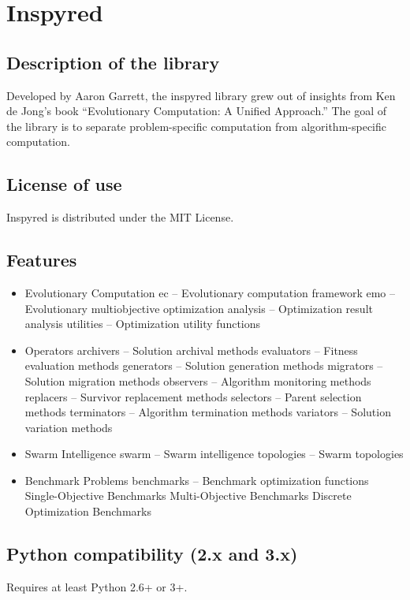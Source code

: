 \documentclass{article}
\begin{document}
\section{Inspyred}
\subsection{Description of the library}
 Developed by Aaron Garrett, the inspyred library grew out of insights from Ken de Jong’s book “Evolutionary Computation: A Unified Approach.” The goal of the library is to separate problem-specific computation from algorithm-specific computation.
\subsection{License of use}
 Inspyred is distributed under the MIT License. 
\subsection{Features}
\begin{itemize}
    \item Evolutionary Computation
        \subitem ec – Evolutionary computation framework
        \subitem emo – Evolutionary multiobjective optimization
        \subitem analysis – Optimization result analysis
        \subitem utilities – Optimization utility functions
    \item Operators
        \subitem archivers – Solution archival methods
        \subitem  evaluators – Fitness evaluation methods
        \subitem generators – Solution generation methods
        \subitem migrators – Solution migration methods
        \subitem observers – Algorithm monitoring methods
        \subitem replacers – Survivor replacement methods
        \subitem selectors – Parent selection methods
        \subitem terminators – Algorithm termination methods
        \subitem variators – Solution variation methods
    \item Swarm Intelligence
        \subitem swarm – Swarm intelligence
        \subitem topologies – Swarm topologies
    \item Benchmark Problems
        \subitem benchmarks – Benchmark optimization functions
        \subitem Single-Objective Benchmarks
        \subitem Multi-Objective Benchmarks
        \subitem Discrete Optimization Benchmarks

\end{itemize}
\subsection{Python compatibility (2.x and 3.x)}
Requires at least Python 2.6+ or 3+.
\end{document}
